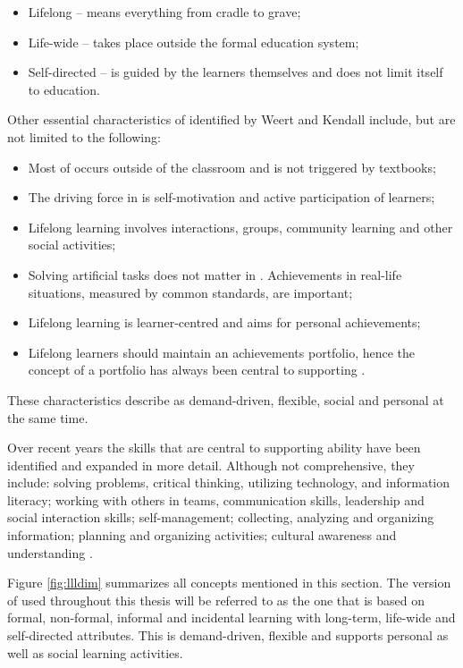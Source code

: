 \begin{itemize}
  \item Lifelong -- means everything from cradle to grave;
  \item Life-wide -- takes place outside the formal education system;
  \item Self-directed -- is guided by the learners themselves and does not
  limit itself to education.
\end{itemize} 

Other essential characteristics of \LLLs identified by Weert and Kendall
\citeyearpar{Kendall2004} include, but are not limited to the following:

\begin{itemize}
  \item Most of \LLLs occurs outside of the classroom and is not triggered by
  textbooks;
  \item The driving force in \LLLs is self-motivation and active participation
  of learners;
  \item Lifelong learning involves interactions, groups, community learning and
  other social activities;
  \item Solving artificial tasks does not matter in \LLLsn. Achievements in
  real-life situations, measured by common standards, are important;
  \item Lifelong learning is learner-centred and aims for personal
  achievements;
  \item Lifelong learners should maintain an achievements portfolio, hence the
  concept of a portfolio has always been central to supporting \LLLsn.
\end{itemize} 

These characteristics describe \LLLs as demand-driven, flexible, social and
personal at the same time.

Over recent years the skills that are central to supporting \LLLs ability have
been identified and expanded in more detail. Although not comprehensive, they
include: solving problems, critical thinking, utilizing technology, and
information literacy; working with others in teams, communication skills,
leadership and social interaction skills; self-management; collecting, analyzing
and organizing information; planning and organizing activities; cultural
awareness and understanding \citep{Brooks2008,Heinrich2007,Otala1997,Pitman2009}. 

Figure \ref{fig:llldim} summarizes all concepts mentioned in this section.
The version of \LLLs used throughout this thesis will be referred to as the one
that is based on formal, non-formal, informal and incidental learning with
long-term, life-wide and self-directed attributes. This \LLLs is demand-driven,
flexible and supports personal as well as social learning activities.

